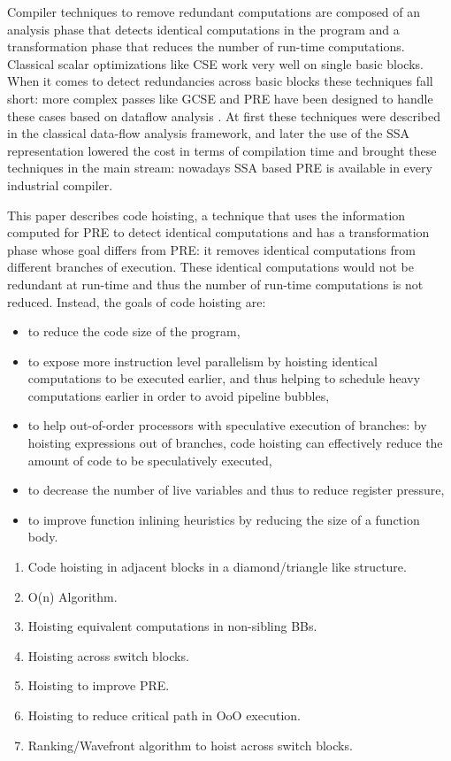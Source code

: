 \documentclass{sig-alternate}
\begin{document}
Compiler techniques to remove redundant computations are composed of an analysis
phase that detects identical computations in the program and a transformation
phase that reduces the number of run-time computations.  Classical scalar
optimizations like CSE \cite{dragonbook} work very well on single basic blocks.
When it comes to detect redundancies across basic blocks these techniques fall
short: more complex passes like GCSE and PRE have been designed to handle these
cases based on dataflow analysis \cite{morel1979global}.  At first these
techniques were described in the classical data-flow analysis framework, and
later the use of the SSA representation lowered the cost in terms of compilation
time \cite{briggs1994effective,chow1997new,kennedy1999partial} and brought these
techniques in the main stream: nowadays SSA based PRE is available in every
industrial compiler.

This paper describes code hoisting, a technique that uses the information
computed for PRE to detect identical computations and has a transformation phase
whose goal differs from PRE: it removes identical computations from different
branches of execution.  These identical computations would not be redundant at
run-time and thus the number of run-time computations is not reduced.  Instead,
the goals of code hoisting are:
\begin{itemize}
\item to reduce the code size of the program,
\item to expose more instruction level parallelism by hoisting identical
  computations to be executed earlier, and thus helping to schedule heavy
  computations earlier in order to avoid pipeline bubbles,
\item to help out-of-order processors with speculative execution of branches: by
  hoisting expressions out of branches, code hoisting can effectively reduce
  the amount of code to be speculatively executed,
\item to decrease the number of live variables and thus to reduce register
  pressure,
\item to improve function inlining heuristics by reducing the size of a function body.
\end{itemize}

\begin{enumerate}
\item Code hoisting in adjacent blocks in a diamond/triangle like structure.
\item O(n) Algorithm.
\item Hoisting equivalent computations in non-sibling BBs.
\item Hoisting across switch blocks.
\item Hoisting to improve PRE.
\item Hoisting to reduce critical path in OoO execution.
\item Ranking/Wavefront algorithm to hoist across switch blocks.
\end{enumerate}
\end{document}
